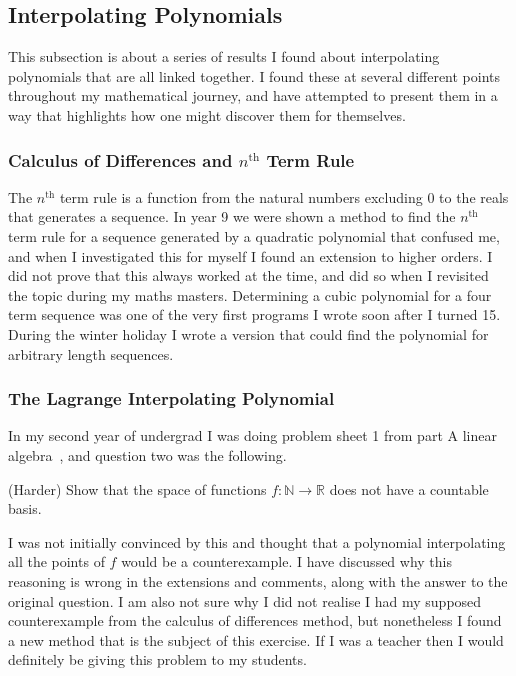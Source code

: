 \subsection{Interpolating Polynomials}

This subsection is about a series of results I found about interpolating polynomials that are all linked together. I found these at several different points throughout my mathematical journey, and have attempted to present them in a way that highlights how one might discover them for themselves.

\subsubsection{Calculus of Differences and $n^\text{th}$ Term Rule}

The $n^\text{th}$ term rule is a function from the natural numbers excluding 0 to the reals that generates a sequence. In year 9 we were shown a method to find the $n^\text{th}$ term rule for a sequence generated by a quadratic polynomial that confused me, and when I investigated this for myself I found an extension to higher orders. I did not prove that this always worked at the time, and did so when I revisited the topic during my maths masters. Determining a cubic polynomial for a four term sequence was one of the very first programs I wrote soon after I turned 15. During the winter holiday I wrote a version that could find the polynomial for arbitrary length sequences.



\subsubsection{The Lagrange Interpolating Polynomial}

In my second year of undergrad I was doing problem sheet 1 from part A linear algebra~\cite{PartALinearAlgebraSheet1}, and question two was the following.

\begin{center}
    (Harder) Show that the space of functions $f : \mathbb{N} \to \mathbb{R}$ does not have a countable basis.
\end{center}

I was not initially convinced by this and thought that a polynomial interpolating all the points of $f$ would be a counterexample. I have discussed why this reasoning is wrong in the extensions and comments, along with the answer to the original question. I am also not sure why I did not realise I had my supposed counterexample from the calculus of differences method, but nonetheless I found a new method that is the subject of this exercise. If I was a teacher then I would definitely be giving this problem to my students.

